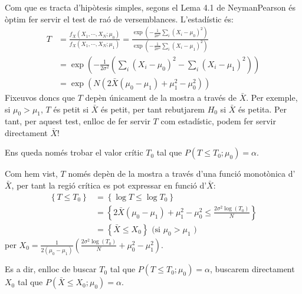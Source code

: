 \documentclass[letterpaper,10pt,english]{sphinxmanual}
\let\sphinxpxdimen\pdfpxdimen\else\newdimen\sphinxpxdimen
\begin{document}
\noindent{\hspace*{\fill}\sphinxincludegraphics[height=250\sphinxpxdimen]{{exemple_ir}.png}\hspace*{\fill}}

Com que es tracta d’hipòtesis simples, segons el Lema 4.1 de Neyman\sphinxhyphen{}Pearson
és òptim fer servir el test de raó de versemblances. L’estadístic és:
\begin{equation*}
\begin{split}T &= \frac{f_X(X_1, \cdots, X_N; \mu_0)}{f_X(X_1, \cdots, X_N; \mu_1)} = \frac{\exp\left(-\frac{1}{2\sigma^2}\sum_i \left(X_i - \mu_0 \right)^2 \right)}{\exp\left(-\frac{1}{2\sigma^2}\sum_i \left(X_i - \mu_1 \right)^2 \right)} \\
  &= \exp\left(-\frac{1}{2\sigma^2}\left(\sum_i \left(X_i - \mu_0 \right)^2 - \sum_i \left(X_i - \mu_1 \right)^2 \right)\right) \\
  &= \exp\left(N\left(2\bar{X}(\mu_0 - \mu_1) + \mu_1^2 - \mu_0^2\right)\right)\end{split}
\end{equation*}
Fixeu\sphinxhyphen{}vos doncs que \(T\) depèn únicament de la mostra a través de \(\bar{X}\).
Per exemple, si \(\mu_0 > \mu_1\), \(T\) és petit si \(\bar{X}\) és petit,
per tant rebutjarem \(H_0\) si \(\bar{X}\) és petita. Per tant, per aquest test,
enlloc de fer servir \(T\) com estadístic, podem fer servir directament \(\bar{X}\)!

Ens queda només trobar el valor crític \(T_0\) tal que \(P(T \leq T_0; \mu_0) = \alpha\).

Com hem vist, \(T\) només depèn de la mostra a través d’una funció monotònica d’ \(\bar{X}\), per tant la regió crítica
es pot expressar en funció d’\(\bar{X}\):
\begin{equation*}
\begin{split} \left\{T \leq T_0 \right\} &= \left\{ \log T \leq \log T_0 \right\} \\
& = \left\{2\bar{X}(\mu_0 - \mu_1) + \mu_1^2 - \mu_0^2 \leq \frac{2 \sigma^2\log(T_0)}{N} \right\} \\
& = \left\{\bar{X} \leq X_0\right\} \mbox{ (si } \mu_0 > \mu_1 \mbox{ )}\end{split}
\end{equation*}
per \(X_0 = \frac{1}{2\left(\mu_0 - \mu_1\right)}\left(\frac{2 \sigma^2\log(T_0)}{N} + \mu_0^2 - \mu_1^2 \right)\).

Es a dir, enlloc de buscar \(T_0\) tal que \(P(T \leq T_0; \mu_0) = \alpha\),
buscarem directament \(X_0\) tal que \(P(\bar{X} \leq X_0; \mu_0) = \alpha\).
\end{document}
